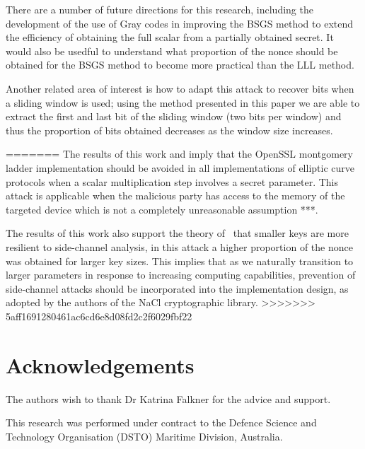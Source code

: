 \documentclass{llncs}
\newcommand{\starpar}[1]{\par{\footnotesize $\star$ \hl{#1}\par}}
\begin{document}
There are a number of future directions for this research, including the development of the use of Gray codes in improving the BSGS method to extend the efficiency of obtaining the full scalar from a partially obtained secret. It would also be usedful to understand what proportion of the nonce should be obtained for the BSGS method to become more practical than the LLL method. 

Another related area of interest is how to adapt this attack to recover bits when a sliding window is used; using the method presented in this paper we are able to extract the first and last bit of the sliding window (two bits per window) and thus the proportion of bits obtained decreases as the window size increases. 



=======
The results of this work and \cite{remote_attack} imply that the OpenSSL montgomery ladder implementation should be avoided in all implementations of elliptic curve protocols when a scalar multiplication step involves a secret parameter. This attack is applicable when the malicious party has access to the memory of the targeted device which is not a completely unreasonable assumption ***. 

The results of this work also support the theory of~\cite{walter04longer} that smaller keys are more resilient to side-channel analysis, in this attack a higher proportion of the nonce was obtained for larger key sizes. This implies that as we naturally transition to larger parameters in response to increasing computing capabilities, prevention of side-channel attacks should be incorporated into the implementation design, as adopted by the authors of the NaCl cryptographic library. 
>>>>>>> 5aff1691280461ac6cd6e8d08fd2c2f6029fbf22


\section*{Acknowledgements}
The authors wish to thank Dr Katrina Falkner for the advice and support.

This research was performed under contract to the Defence
Science and Technology Organisation (DSTO) Maritime Division,
Australia.




\end{document}
